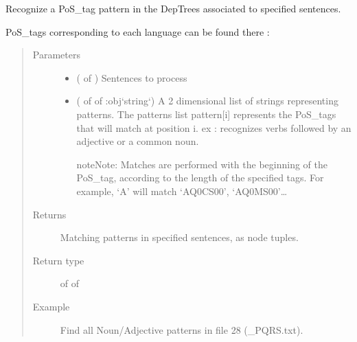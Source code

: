 \documentclass[letterpaper,10pt,english]{sphinxmanual}
\begin{document}
\begin{fulllineitems}
\label{\detokenize{index:loacore.analysis.pattern_recognition.pos_tag_patterns_recognition}}
Recognize a PoS\_tag pattern in the DepTrees associated to specified sentences.

PoS\_tags corresponding to each language can be found there :
\begin{quote}\begin{description}
\item[{Parameters}] \leavevmode\begin{itemize}
\item {} 
 ( of ) \textendash{} Sentences to process

\item {} 
 ( of  of :obj{}`string{}`) \textendash{} 
A 2 dimensional list of strings representing patterns. The patterns list pattern{[}i{]} represents the PoS\_tags that
will match at position i. ex :  recognizes verbs followed by an adjective or a
common noun.

\begin{sphinxadmonition}{note}{Note:}
Matches are performed with the beginning of the PoS\_tag, according to the length of the specified
tags. For example, ‘A’ will match ‘AQ0CS00’, ‘AQ0MS00’…
\end{sphinxadmonition}


\end{itemize}

\item[{Returns}] \leavevmode
Matching patterns in specified sentences, as node tuples.

\item[{Return type}] \leavevmode
{} of  of 

\item[{Example}] \leavevmode
Find all Noun/Adjective patterns in file 28 (\_PQRS.txt).


\end{description}
\end{quote}
\end{fulllineitems}
\end{document}
